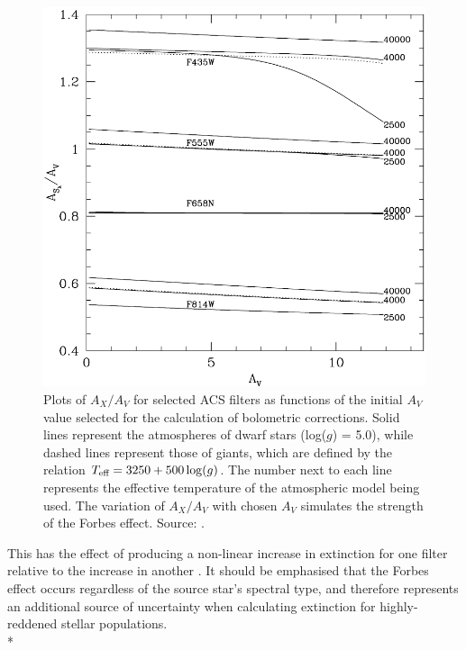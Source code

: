 \documentclass[12pt, a4paper]{report}
\begin{document}
\begin{figure}[h!]
\begin{center}
\includegraphics[width=1.0\textwidth]{girardi_forbes_effect_figure.png}
\caption{Plots of $A_{X}/A_{V}$ for selected ACS filters as functions of the initial $A_{V}$ value selected for the calculation of bolometric corrections. Solid lines represent the atmospheres of dwarf stars (log($g$) = 5.0), while dashed lines represent those of giants, which are defined by the relation $T_{\textnormal{eff}} = 3250 + 500\log(g)$. The number next to each line represents the effective temperature of  the atmospheric model being used. The variation of $A_{X}/A_{V}$ with chosen $A_{V}$ simulates the  strength of the Forbes effect. Source: \cite{2008PASP..120..583G}.}
\label{girardi_forbes}
\end{center}
\end{figure}

This has the effect of producing a non-linear increase in extinction for one filter relative to the increase in another \citep{1995A&AS..109..293G,2008PASP..120..583G}. It should be emphasised that the Forbes effect occurs regardless of the source star's spectral type, and therefore represents an additional source of uncertainty when calculating extinction for highly-reddened stellar populations. \\*
\end{document}
